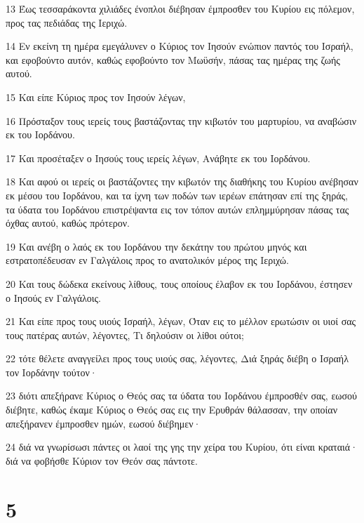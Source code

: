 \par 13 Έως τεσσαράκοντα χιλιάδες ένοπλοι διέβησαν έμπροσθεν του Κυρίου εις πόλεμον, προς τας πεδιάδας της Ιεριχώ.
\par 14 Εν εκείνη τη ημέρα εμεγάλυνεν ο Κύριος τον Ιησούν ενώπιον παντός του Ισραήλ, και εφοβούντο αυτόν, καθώς εφοβούντο τον Μωϋσήν, πάσας τας ημέρας της ζωής αυτού.
\par 15 Και είπε Κύριος προς τον Ιησούν λέγων,
\par 16 Πρόσταξον τους ιερείς τους βαστάζοντας την κιβωτόν του μαρτυρίου, να αναβώσιν εκ του Ιορδάνου.
\par 17 Και προσέταξεν ο Ιησούς τους ιερείς λέγων, Ανάβητε εκ του Ιορδάνου.
\par 18 Και αφού οι ιερείς οι βαστάζοντες την κιβωτόν της διαθήκης του Κυρίου ανέβησαν εκ μέσου του Ιορδάνου, και τα ίχνη των ποδών των ιερέων επάτησαν επί της ξηράς, τα ύδατα του Ιορδάνου επιστρέψαντα εις τον τόπον αυτών επλημμύρησαν πάσας τας όχθας αυτού, καθώς πρότερον.
\par 19 Και ανέβη ο λαός εκ του Ιορδάνου την δεκάτην του πρώτου μηνός και εστρατοπέδευσαν εν Γαλγάλοις προς το ανατολικόν μέρος της Ιεριχώ.
\par 20 Και τους δώδεκα εκείνους λίθους, τους οποίους έλαβον εκ του Ιορδάνου, έστησεν ο Ιησούς εν Γαλγάλοις.
\par 21 Και είπε προς τους υιούς Ισραήλ, λέγων, Όταν εις το μέλλον ερωτώσιν οι υιοί σας τους πατέρας αυτών, λέγοντες, Τι δηλούσιν οι λίθοι ούτοι;
\par 22 τότε θέλετε αναγγείλει προς τους υιούς σας, λέγοντες, Διά ξηράς διέβη ο Ισραήλ τον Ιορδάνην τούτον·
\par 23 διότι απεξήρανε Κύριος ο Θεός σας τα ύδατα του Ιορδάνου έμπροσθέν σας, εωσού διέβητε, καθώς έκαμε Κύριος ο Θεός σας εις την Ερυθράν θάλασσαν, την οποίαν απεξήρανεν έμπροσθεν ημών, εωσού διέβημεν·
\par 24 διά να γνωρίσωσι πάντες οι λαοί της γης την χείρα του Κυρίου, ότι είναι κραταιά· διά να φοβήσθε Κύριον τον Θεόν σας πάντοτε.

\chapter{5}

